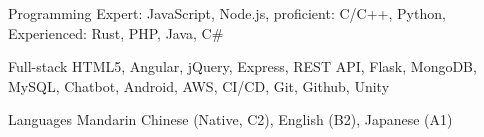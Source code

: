 
\begin{cvskills}
    \cvskill
    {Programming} %
    {Expert: JavaScript, Node.js, proficient: C/C++, Python, Experienced: Rust, PHP, Java, C\#} %

      \cvskill
        {Full-stack} %
        {HTML5, Angular, jQuery, Express, REST API, Flask, MongoDB, MySQL, Chatbot, Android, AWS, CI/CD, Git, Github, Unity} %

      \cvskill
        {Languages} %
        {Mandarin Chinese (Native, C2), English (B2), Japanese (A1)} %
    
\end{cvskills}

